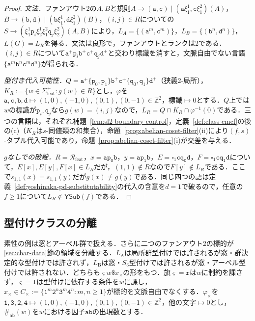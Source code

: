 \documentclass[11pt,a4paper]{ltjsarticle}
\numberwithin{equation}{section}
\theoremstyle{plain}
\theoremstyle{definition}
\theoremstyle{remark}
\newcommand{\blank}{\square}
\newcommand{\YSub}[1]{\mathsf{YSub}(#1)}
\begin{document}
\begin{proof}
\emph{文法．}ファンアウト2の$A,B$と規則$A\to(\mathtt a,\mathtt c)\mid(\mathtt a\xi_1^1,\mathtt c\xi_1^2)(A)$，$B\to(\mathtt b,\mathtt d)\mid(\mathtt b\xi_1^1,\mathtt d\xi_1^2)(B)$，$(i,j)\in R$についての$S\to(\xi_1^1\mathtt p_i\xi_2^1\xi_1^2\mathtt q_j\xi_2^2)(A,B)$により，$L_A=\{(\mathtt a^m,\mathtt c^m)\}$，$L_B=\{(\mathtt b^n,\mathtt d^n)\}$，$L(G)=L_R$を得る．文法は良形で，ファンアウトとランクは2である．$(i,j)\in R$について$\mathtt a^+\mathtt p_i\mathtt b^+\mathtt c^+\mathtt q_j\mathtt d^+$と交わり標識を消すと，文脈自由でない言語$\{\mathtt a^m\mathtt b^n\mathtt c^m\mathtt d^n\}$が得られる．

\emph{型付き代入可能性．}$Q=\mathtt a^+\{\mathtt p_0,\mathtt p_1\}\mathtt b^+\mathtt c^+\{\mathtt q_0,\mathtt q_1\}\mathtt d^+$（狭義2-局所），$K_R:=\{w\in\Sigma_{\mathrm{feat}}^+:g(w)\in R\}$とし，$\varphi$を$\mathtt a,\mathtt c,\mathtt b,\mathtt d\mapsto(1,0),(-1,0),(0,1),(0,-1)\in\mathbb Z^2$，標識$\mapsto0$とする．$Q$上では$w$の標識が$\mathtt p_i,\mathtt q_j$なら$g(w)=(i,j)$なので，$L_R=Q\cap K_R\cap\varphi^{-1}(0)$である．三つの言語は，それぞれ補題~\ref{lem:sl2-boundary-control}，定義~\ref{def:class-cmcf}の後の(c)（$K_R$は$s$-同値類の和集合），命題~\ref{prop:abelian-coset-filter}(ii)により$(f,s)$-タプル代入可能であり，命題~\ref{prop:abelian-coset-filter}(i)が交差を与える．

\emph{$g$なしでの破綻．}$R=\mathcal R_{\mathrm{feat}}$，$x=\mathtt{ap_0b}$，$y=\mathtt{ap_1b}$，$E=\blank_1\mathtt{cq_0d}$，$F=\blank_1\mathtt{cq_1d}$について，$E[x],E[y],F[x]\in L_R$だが，$(1,1)\notin R$なので$F[y]\notin L_R$である．ここで$s_{1,1}(x)=s_{1,1}(y)$だが$g(x)\ne g(y)$である．同じ四つの語は定義~\ref{def:yoshinaka-pd-substitutability}の代入の含意を$d=1$で破るので，任意の$f\ge1$について$L_R\notin\YSub{f}$である．
\end{proof}

\subsection{型付けクラスの分離}
\label{subsec:necessity}

素性の例は窓とアーベル群で扱える．さらに二つのファンアウト2の標的が\ref{sec:char-data}節の領域を分離する．$L_{\mathrm A}$は局所群型付けでは許されるが窓・群決定的な型付けでは許されず，$L_{\mathrm B}$は窓・$S_3$型付けでは許されるが窓・アーベル型付けでは許されない．どちらも$\varsigma w\mathtt\$x_\times$の形をもつ．旗$\varsigma=\mathtt r$は$w$に制約を課さず，$\varsigma=\mathtt l$は型付けに依存する条件を$w$に課し，$x_\times\in C_\times:=\{\mathtt{1}^m\mathtt{2}^n\mathtt{3}^m\mathtt{4}^n:m,n\ge1\}$が標的を文脈自由でなくする．$\varphi_\times$を$\mathtt 1,\mathtt 3,\mathtt 2,\mathtt 4\mapsto(1,0),(-1,0),(0,1),(0,-1)\in\mathbb Z^2$，他の文字$\mapsto0$とし，$\#_{\mathtt{ab}}(w)$を$w$における因子$\mathtt{ab}$の出現数とする．
\end{document}
